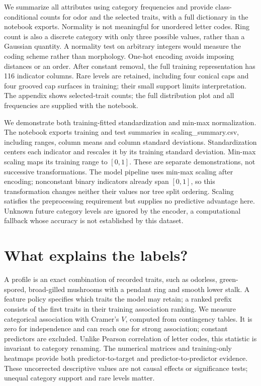 \documentclass[11pt]{article}
\begin{document}
We summarize all attributes using category frequencies and provide class-conditional counts for odor and the selected traits, with a full dictionary in the notebook exports. Normality is not meaningful for unordered letter codes. Ring count is also a discrete category with only three possible values, rather than a Gaussian quantity. A normality test on arbitrary integers would measure the coding scheme rather than morphology. One-hot encoding avoids imposing distances or an order. After constant removal, the full training representation has 116 indicator columns. Rare levels are retained, including four conical caps and four grooved cap surfaces in training; their small support limits interpretation. The appendix shows selected-trait counts; the full distribution plot and all frequencies are supplied with the notebook.

We demonstrate both training-fitted standardization and min-max normalization. The notebook exports training and test summaries in scaling\_summary.csv, including ranges, column means and column standard deviations. Standardization centers each indicator and rescales it by its training standard deviation. Min-max scaling maps its training range to $[0,1]$. These are separate demonstrations, not successive transformations. The model pipeline uses min-max scaling after encoding; nonconstant binary indicators already span $[0,1]$, so this transformation changes neither their values nor tree split ordering. Scaling satisfies the preprocessing requirement but supplies no predictive advantage here. Unknown future category levels are ignored by the encoder, a computational fallback whose accuracy is not established by this dataset.

\section{What explains the labels?}
A profile is an exact combination of recorded traits, such as odorless, green-spored, broad-gilled mushrooms with a pendant ring and smooth lower stalk. A feature policy specifies which traits the model may retain; a ranked prefix consists of the first traits in their training association ranking. We measure categorical association with Cramer's $V$, computed from contingency tables. It is zero for independence and can reach one for strong association; constant predictors are excluded. Unlike Pearson correlation of letter codes, this statistic is invariant to category renaming. The numerical matrices and training-only heatmaps provide both predictor-to-target and predictor-to-predictor evidence. These uncorrected descriptive values are not causal effects or significance tests; unequal category support and rare levels matter.
\end{document}
